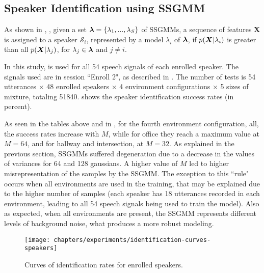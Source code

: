 \subsection{Speaker Identification using SSGMM}

As shown in , , given a set $\boldsymbol{\lambda} = \{\lambda_1, ..., \lambda_S\}$ of SSGMMs, a sequence of features $\boldsymbol{X}$ is assigned to a speaker $\mathcal{S}_i$, represented by a model $\lambda_i$ of $\boldsymbol{\lambda}$, if $p(\boldsymbol{X}|\lambda_i)$ is greater than all $p(\boldsymbol{X}|\lambda_j)$, for $\lambda_j \in \boldsymbol{\lambda}$ and $j \ne i$.

In this study,  is used for all 54 speech signals of each enrolled speaker. The signals used are in session ``Enroll 2", as described in . The number of tests is 54 utterances $\times$ 48 enrolled speakers $\times$ 4 environment configurations $\times$ 5 sizes of mixture, totaling 51840.  shows the speaker identification success rates (in percent).



As seen in the tables above and in , for the fourth environment configuration, all, the success rates increase with $M$, while for office they reach a maximum value at $M = 64$, and for hallway and intersection, at $M = 32$. As explained in the previous section, SSGMMs suffered degeneration due to a decrease in the values of variances for 64 and 128 gaussians. A higher value of $M$ led to higher misrepresentation of the samples by the SSGMM. The exception to this ``rule" occurs when all environments are used in the training, that may be explained due to the higher number of samples (each speaker has 18 utterances recorded in each environment, leading to all 54 speech signals being used to train the model). Also as expected, when all environments are present, the SSGMM represents different levels of background noise, what produces a more robust modeling.

\begin{figure}[ht]
    \centering
    \texttt{[image: chapters/experiments/identification-curves-speakers]}
    \caption{Curves of identification rates for enrolled speakers.}
    \label{fig:identification-curves-speakers}
\end{figure}

